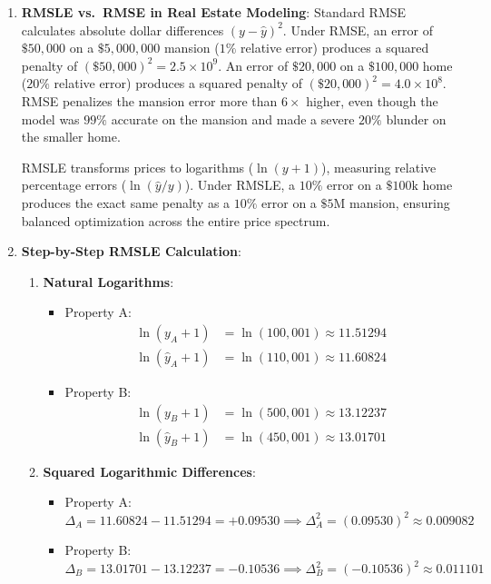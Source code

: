 \begin{enumerate}
    \item \textbf{RMSLE vs.\ RMSE in Real Estate Modeling}:
    Standard RMSE calculates absolute dollar differences $(y - \hat{y})^2$. Under RMSE, an error of $\$50{,}000$ on a $\$5{,}000{,}000$ mansion ($1\%$ relative error) produces a squared penalty of $(\$50{,}000)^2 = 2.5 \times 10^9$. An error of $\$20{,}000$ on a $\$100{,}000$ home ($20\%$ relative error) produces a squared penalty of $(\$20{,}000)^2 = 4.0 \times 10^8$. RMSE penalizes the mansion error more than $6\times$ higher, even though the model was $99\%$ accurate on the mansion and made a severe $20\%$ blunder on the smaller home.
    
    RMSLE transforms prices to logarithms ($\ln(y + 1)$), measuring relative percentage errors ($\ln(\hat{y}/y)$). Under RMSLE, a $10\%$ error on a $\$100\text{k}$ home produces the exact same penalty as a $10\%$ error on a $\$5\text{M}$ mansion, ensuring balanced optimization across the entire price spectrum.

    \item \textbf{Step-by-Step RMSLE Calculation}:
    \begin{enumerate}
        \item \textbf{Natural Logarithms}:
        \begin{itemize}
            \item Property A:
            \begin{align*}
            \ln(y_A + 1) &= \ln(100{,}001) \approx \mathbf{11.51294} \\
            \ln(\hat{y}_A + 1) &= \ln(110{,}001) \approx \mathbf{11.60824}
            \end{align*}
            \item Property B:
            \begin{align*}
            \ln(y_B + 1) &= \ln(500{,}001) \approx \mathbf{13.12237} \\
            \ln(\hat{y}_B + 1) &= \ln(450{,}001) \approx \mathbf{13.01701}
            \end{align*}
        \end{itemize}

        \item \textbf{Squared Logarithmic Differences}:
        \begin{itemize}
            \item Property A: $\Delta_A = 11.60824 - 11.51294 = +0.09530 \implies \Delta_A^2 = (0.09530)^2 \approx \mathbf{0.009082}$
            \item Property B: $\Delta_B = 13.01701 - 13.12237 = -0.10536 \implies \Delta_B^2 = (-0.10536)^2 \approx \mathbf{0.011101}$
        \end{itemize}


\end{enumerate}
\end{enumerate}
